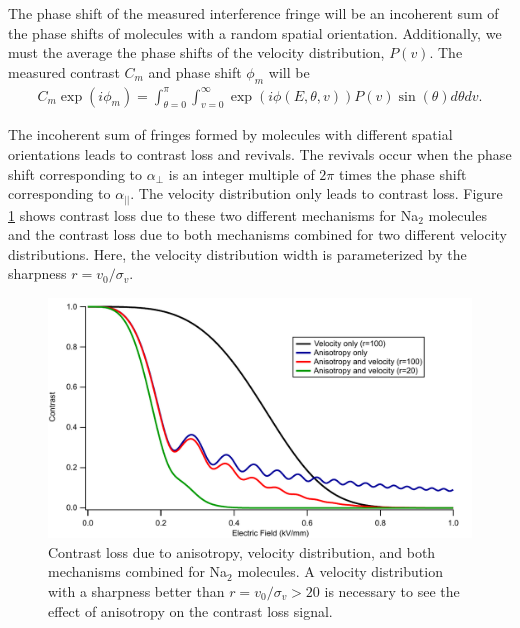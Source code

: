 The phase shift of the measured interference fringe will be an incoherent sum of the phase shifts of molecules with a random spatial orientation. Additionally, we must the average the phase shifts of the velocity distribution, $P(v)$. The measured contrast $C_m$ and phase shift $\phi_m$ will be
\begin{eqnarray}
C_m\exp(i\phi_m) = \int_{\theta=0}^\pi \int_{v=0}^\infty \exp(i\phi(E,\theta,v))P(v) \sin(\theta) d\theta dv.
\end{eqnarray}

The incoherent sum of fringes formed by molecules with different spatial orientations leads to contrast loss and revivals. The revivals occur when the phase shift corresponding to $\alpha_\perp$ is an integer multiple of $2\pi$ times the phase shift corresponding to $\alpha_{||}$. The velocity distribution only leads to contrast loss. Figure \ref{molConVelGamma} shows contrast loss due to these two different mechanisms for Na$_2$ molecules and the contrast loss due to both mechanisms combined for two different velocity distributions. Here, the velocity distribution width is parameterized by the sharpness $r=v_0/\sigma_v$. 
\begin{figure}
\includegraphics[width=1\textwidth]{Figures/molConVelAndGamma3.pdf}
\caption[Contrast loss due to tensor anisotropy for Na$_2$ molecules]{\label{molConVelGamma}Contrast loss due to anisotropy, velocity distribution, and both mechanisms combined for Na$_2$ molecules. A velocity distribution with a sharpness better than $r=v_0/\sigma_v > 20$ is necessary to see the effect of anisotropy on the contrast loss signal.}
\end{figure}
%

